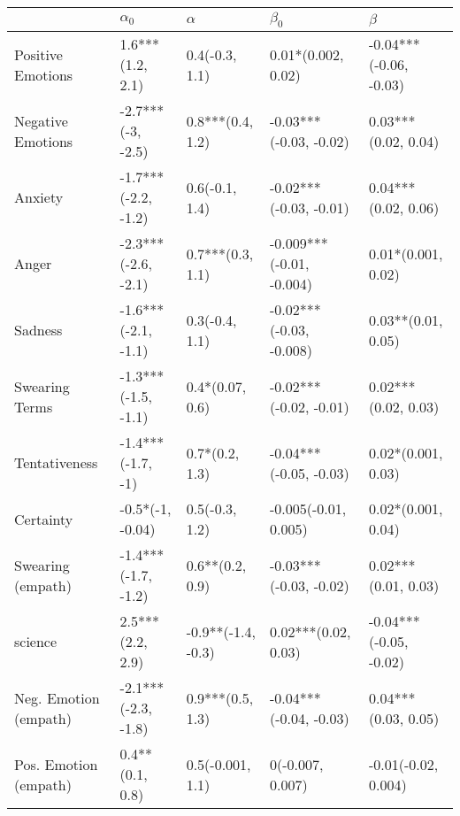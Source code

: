 \begin{tabular}{lllll}
\toprule
{} &           $\alpha_0$ &            $\alpha$ &                 $\beta_0$ &                 $\beta$ \\
\midrule
Positive Emotions     &     1.6***(1.2, 2.1) &      0.4(-0.3, 1.1) &        0.01*(0.002, 0.02) &  -0.04***(-0.06, -0.03) \\
Negative Emotions     &    -2.7***(-3, -2.5) &    0.8***(0.4, 1.2) &    -0.03***(-0.03, -0.02) &     0.03***(0.02, 0.04) \\
Anxiety               &  -1.7***(-2.2, -1.2) &      0.6(-0.1, 1.4) &    -0.02***(-0.03, -0.01) &     0.04***(0.02, 0.06) \\
Anger                 &  -2.3***(-2.6, -2.1) &    0.7***(0.3, 1.1) &  -0.009***(-0.01, -0.004) &      0.01*(0.001, 0.02) \\
Sadness               &  -1.6***(-2.1, -1.1) &      0.3(-0.4, 1.1) &   -0.02***(-0.03, -0.008) &      0.03**(0.01, 0.05) \\
Swearing Terms        &  -1.3***(-1.5, -1.1) &     0.4*(0.07, 0.6) &    -0.02***(-0.02, -0.01) &     0.02***(0.02, 0.03) \\
Tentativeness         &    -1.4***(-1.7, -1) &      0.7*(0.2, 1.3) &    -0.04***(-0.05, -0.03) &      0.02*(0.001, 0.03) \\
Certainty             &     -0.5*(-1, -0.04) &      0.5(-0.3, 1.2) &      -0.005(-0.01, 0.005) &      0.02*(0.001, 0.04) \\
Swearing (empath)     &  -1.4***(-1.7, -1.2) &     0.6**(0.2, 0.9) &    -0.03***(-0.03, -0.02) &     0.02***(0.01, 0.03) \\
science               &     2.5***(2.2, 2.9) &  -0.9**(-1.4, -0.3) &       0.02***(0.02, 0.03) &  -0.04***(-0.05, -0.02) \\
Neg. Emotion (empath) &  -2.1***(-2.3, -1.8) &    0.9***(0.5, 1.3) &    -0.04***(-0.04, -0.03) &     0.04***(0.03, 0.05) \\
Pos. Emotion (empath) &      0.4**(0.1, 0.8) &    0.5(-0.001, 1.1) &          0(-0.007, 0.007) &     -0.01(-0.02, 0.004) \\
\bottomrule
\end{tabular}
